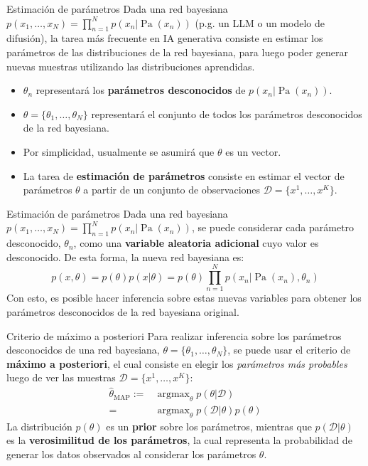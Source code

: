 \documentclass{beamer}
\newcommand{\argmax}{\operatorname{argmax}}
\begin{document}
\begin{frame}{Estimación de parámetros}
    Dada una red bayesiana $p(x_1,\ldots,x_N)=\prod_{n=1}^N p(x_n|\operatorname{Pa}(x_n))$ (p.g. un LLM o un modelo de difusión), la tarea más frecuente en IA generativa consiste en estimar los parámetros de las distribuciones de la red bayesiana, para luego poder generar nuevas muestras utilizando las distribuciones aprendidas.
    \begin{itemize}
        \item $\theta_n$ representará los \textbf{parámetros desconocidos} de $p(x_n|\operatorname{Pa}(x_n))$.
        \item $\theta=\{\theta_1,\ldots,\theta_N\}$ representará el conjunto de todos los parámetros desconocidos de la red bayesiana.
        \item Por simplicidad, usualmente se asumirá que $\theta$ es un vector.
        \item La tarea de \textbf{estimación de parámetros} consiste en estimar el vector de parámetros $\theta$ a partir de un conjunto de observaciones $\mathcal{D}=\{x^1,\ldots,x^K\}$.
    \end{itemize}
\end{frame}

\begin{frame}{Estimación de parámetros}
    Dada una red bayesiana $p(x_1,\ldots,x_N)=\prod_{n=1}^N p(x_n|\operatorname{Pa}(x_n))$, se puede considerar cada parámetro desconocido, $\theta_n$, como una \textbf{variable aleatoria adicional} cuyo valor es desconocido. De esta forma, la nueva red bayesiana es:
    \begin{equation*}
        p(x,\theta)=p(\theta)p(x|\theta)=p(\theta)\prod_{n=1}^N
        p(x_n|\operatorname{Pa}(x_n),\theta_n)
    \end{equation*}
    Con esto, es posible hacer inferencia sobre estas nuevas variables para obtener los parámetros desconocidos de la red bayesiana original.
\end{frame}

\begin{frame}{Criterio de máximo a posteriori}
    Para realizar inferencia sobre los parámetros desconocidos de una red bayesiana, $\theta=\{\theta_1,\ldots,\theta_N\}$, se puede usar el criterio de \textbf{máximo a posteriori}, el cual consiste en elegir los \textit{parámetros más probables} luego de ver las muestras $\mathcal{D}=\{x^1,\ldots,x^K\}$:
    \begin{align*}
        \hat\theta_{\text{MAP}}  := & \argmax_\theta p(\theta|\mathcal{D})          \\
        =                           & \argmax_\theta p(\mathcal{D}|\theta)p(\theta)
    \end{align*}
    La distribución $p(\theta)$ es un \textbf{prior} sobre los parámetros, mientras que $p(\mathcal{D}|\theta)$ es la \textbf{verosimilitud de los parámetros}, la cual representa la probabilidad de generar los datos observados al considerar los parámetros $\theta$.
\end{frame}
\end{document}
